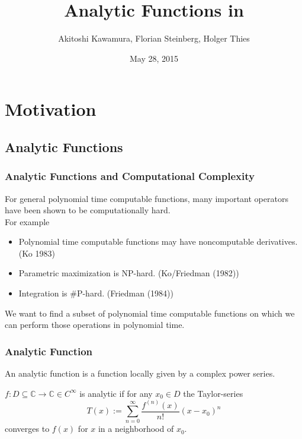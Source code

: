 \documentclass[xcolor=pdftex,dvipsnames,table]{beamer}
\title[Analytic Continuation in iRRAM]{Analytic Functions in \irram}
\author[A. Kawamura, F. Steinberg, H. Thies]{
		Akitoshi Kawamura, Florian Steinberg, Holger Thies 
}
\institute[Theorietag]{
  69. Workshop \"{u}ber Algorithmen und Komplexit\"{a}t, Technische Universit\"{a}t Ilmenau
}
\newcommand{\C}{\ensuremath{\mathbb{C}}}
\begin{document}
\date{May 28, 2015}
\frame{
\titlepage
}


\section{Motivation}
\subsection{Analytic Functions}
\begin{frame}[<+->]
\frametitle{Analytic Functions and Computational Complexity}
\begin{fact}
For general polynomial time computable functions, many important operators have been shown to be computationally hard.\\
For example
\begin{itemize}
\item Polynomial time computable functions may have noncomputable derivatives. (Ko 1983)
\item Parametric maximization is NP-hard. (Ko/Friedman (1982))
\item Integration is \#P-hard. (Friedman (1984))
\end{itemize}
\end{fact}
\pause
We want to find a subset of polynomial time computable functions on which we can perform those operations in polynomial time.
\end{frame}
\begin{frame}
\frametitle{Analytic Function}
An analytic function is a function locally given by a complex power series.\\
\begin{definition}
$f : D \subseteq \C \to \C \in C^\infty$ is analytic if for any $x_0 \in D$ the Taylor-series
$$ T(x) := \sum^\infty_{n=0} \frac{f^{(n)}(x)}{n!}(x-x_0)^n$$
converges to $f(x)$ for $x$ in a neighborhood of $x_0$.  
\end{definition}
\end{frame}
\end{document}

